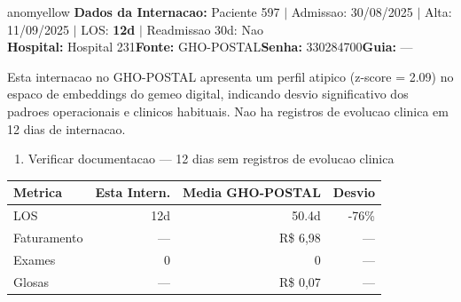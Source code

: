 \documentclass[a4paper,10pt]{article}
\begin{document}
\begin{anomalycard}[Internacao 126 | GHO-POSTAL | MODERADO (z=2.09)]{anomyellow}
\textbf{Dados da Internacao:} Paciente 597 $\mid$ Admissao: 30/08/2025 $\mid$ Alta: 11/09/2025 $\mid$ LOS: \textbf{12d} $\mid$ Readmissao 30d: Nao\\
\textbf{Hospital:} Hospital 231\quad\textbf{Fonte:} GHO-POSTAL\quad\textbf{Senha:} 330284700\quad\textbf{Guia:} ---\\
\vspace{2pt}\begin{tcolorbox}[colback=severityred!20,colframe=anomyellow,title={\textbf{Interpretacao de Negocio}},fonttitle=\bfseries\small,left=4pt,right=4pt,top=3pt,bottom=3pt]
{\small Esta internacao no GHO-POSTAL apresenta um perfil atipico (z-score = 2.09) no espaco de embeddings do gemeo digital, indicando desvio significativo dos padroes operacionais e clinicos habituais. Nao ha registros de evolucao clinica em 12 dias de internacao.}
\end{tcolorbox}
\begin{tcolorbox}[colback=severityyellow!30,colframe=anomorange,title={\textbf{Recomendacoes Especificas}},fonttitle=\bfseries\small,left=4pt,right=4pt,top=3pt,bottom=3pt]
\begin{enumerate}[nosep,leftmargin=16pt]
\item {\small Verificar documentacao --- 12 dias sem registros de evolucao clinica}
\end{enumerate}
\end{tcolorbox}
\begin{center}\begin{tabular}{l r r r}\toprule\textbf{Metrica} & \textbf{Esta Intern.} & \textbf{Media GHO-POSTAL} & \textbf{Desvio} \\\midrule
LOS & 12d & 50.4d & -76\% \\
Faturamento & --- & R\$ 6,98 & --- \\
Exames & 0 & 0 & --- \\
Glosas & --- & R\$ 0,07 & --- \\
\bottomrule\end{tabular}\end{center}


\end{anomalycard}
\end{document}
